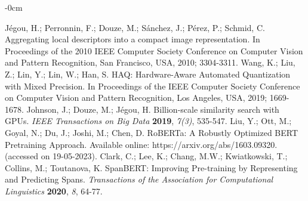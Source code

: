 \documentclass[mathematics,article,submit,moreauthors]{Definitions/mdpi}
\newcommand{\1}[1]{\mathds{1}\left[#1\right]}
\begin{document}
\begin{adjustwidth}{-\extralength}{0cm}
\begin{thebibliography}{999}
	Jégou, H.; Perronnin, F.; Douze, M.; Sánchez, J.; Pérez, P.; Schmid, C. Aggregating local descriptors into a compact image representation. In Proceedings of the 2010 IEEE Computer Society Conference on Computer Vision and Pattern Recognition, San Francisco, USA, 2010; 3304-3311.
	Wang, K.; Liu, Z.; Lin, Y.; Lin, W.; Han, S. HAQ: Hardware-Aware Automated Quantization with Mixed Precision. In Proceedings of  the IEEE Computer Society Conference on Computer Vision and Pattern Recognition, Los Angeles, USA, 2019; 1669-1678.	
	Johnson, J.; Douze, M.; Jégou, H. Billion-scale similarity search with GPUs. {\em IEEE Transactions on Big Data} {\bf 2019}, {\em 7(3)}, 535-547.	
	Liu, Y.; Ott, M.; Goyal, N.; Du, J.; Joshi, M.; Chen, D. RoBERTa: A Robustly Optimized BERT Pretraining Approach. Available online: https://arxiv.org/abs/1603.09320. (accessed on 19-05-2023).
	Clark, C.; Lee, K.; Chang, M.W.; Kwiatkowski, T.; Collins, M.; Toutanova, K. SpanBERT: Improving Pre-training by Representing and Predicting Spans. {\em Transactions of the Association for Computational Linguistics} {\bf 2020}, {\em 8}, 64-77.

\end{thebibliography}
\end{adjustwidth}
\end{document}
